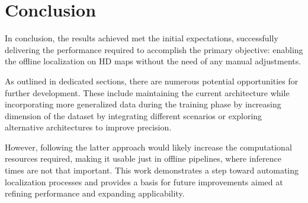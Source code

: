 \chapter*{Conclusion}

In conclusion, the results achieved met the initial expectations, successfully delivering the performance required to accomplish the primary objective: enabling the offline localization on HD maps without the need of any manual adjustments.

As outlined in dedicated sections, there are numerous potential opportunities for further development. These include maintaining the current architecture while incorporating more generalized data during the training phase by increasing dimension of the dataset by integrating different scenarios or exploring alternative architectures to improve precision. 

However, following the latter approach would likely increase the computational resources required, making it usable just in offline pipelines, where inference times are not that important.
This work demonstrates a step toward automating localization processes and provides a basis for future improvements aimed at refining performance and expanding applicability.
